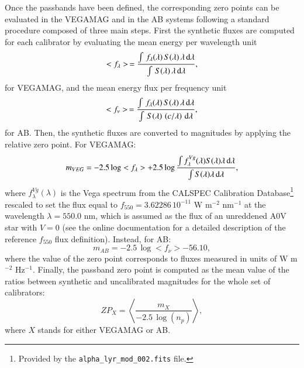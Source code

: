 \documentclass{aa}
\begin{document}
Once the passbands have been defined, the corresponding zero points can be evaluated in the VEGAMAG and in the AB systems following a standard procedure composed of three main steps. First the synthetic fluxes are computed for each calibrator by evaluating the mean energy per wavelength unit
\begin{equation}
\label{vegamagflux}
<f_\lambda>\, = \frac{\int\, f_\lambda(\lambda) \,S(\lambda)\,\lambda \, {\rm d}\lambda }{\int\, S(\lambda)\,\lambda \, {\rm d}\lambda },
\end{equation}
for VEGAMAG, and the mean energy flux per frequency unit
\begin{equation}
\label{abflux}
<f_\nu>\, = \frac{\int\, f_\lambda(\lambda) \,S(\lambda)\,\lambda \, {\rm d}\lambda }{\int\, S(\lambda)\,\left(c/\lambda\right) \, {\rm d}\lambda },
\end{equation}
for AB.
Then, the synthetic fluxes are converted to magnitudes by applying the relative zero point. For VEGAMAG:
\begin{equation}
\label{eq:vegamagmag}
m_{VEG} = -2.5 \log <f_\lambda> + 2.5 \log 
 \frac{\int f_\lambda^{Vg}(\lambda) S(\lambda)\lambda \, {\rm d}\lambda } {\int S(\lambda)\lambda \, {\rm d}\lambda },
\end{equation}
where  $f_{\lambda}^{Vg}(\lambda)$ is the Vega spectrum from the CALSPEC Calibration Database\footnote{Provided by the \texttt{alpha\_lyr\_mod\_002.fits} file.} rescaled to set the flux equal to $f_{550} = 3.62286\,10^{-11}$ W m$^{-2}$ nm$^{-1}$ at the wavelength $\lambda=550.0$ nm, which is assumed as the flux of an unreddened A0V star with $V=0$ (see the online documentation for a detailed description of the reference $f_{550}$ flux definition). Instead, for AB:
\begin{equation}
\label{abmag}
m_{AB} = -2.5 \, \log <f_\nu> - 56.10,
\end{equation}
where the value of the zero point corresponds to fluxes measured in units of W m$^{-2}$ Hz$^{-1}$.
Finally, the passband zero point is computed as the mean value of the ratios between synthetic and uncalibrated magnitudes for the whole set of calibrators:
\begin{equation}
\label{zp}
ZP_{X} = \left< \frac{m_X}{ -2.5 \, \log (n_p)} \right>,
\end{equation}
where $X$ stands for either VEGAMAG or AB.
\end{document}
